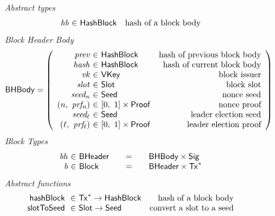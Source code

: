 \begin{figure*}[htb]
  \emph{Abstract types}
  \begin{equation*}
    \begin{array}{r@{~\in~}lr}
      \var{hb} & \HashBlock & \text{hash of a block body}\\
    \end{array}
  \end{equation*}
  \emph{Block Header Body}
  \begin{equation*}
    \BHBody =
    \left(
      \begin{array}{r@{~\in~}lr}
        \var{prev} & \HashBlock & \text{hash of previous block body}\\
        \var{hash} & \HashBlock & \text{hash of current block body}\\
        \var{vk} & \VKey & \text{block issuer}\\
        \var{slot} & \Slot & \text{block slot}\\
        \var{seed_{n}} & \Seed & \text{nonce seed}\\
        (n,~\var{prf_{n}}) & \unitInterval\times\Proof & \text{nonce proof}\\
        \var{seed_{\ell}} & \Seed & \text{leader election seed}\\
        (\ell,~\var{prf_{\ell}}) & \unitInterval\times\Proof & \text{leader election proof}\\
      \end{array}
    \right)
  \end{equation*}
  \emph{Block Types}
  \begin{equation*}
    \begin{array}{r@{~\in~}l@{\qquad=\qquad}l}
      \var{bh}
      & \BHeader
      & \BHBody \times \Sig
      \\
      \var{b}
      & \Block
      & \BHeader \times \seqof{\Tx}
    \end{array}
  \end{equation*}
  \emph{Abstract functions}
  \begin{equation*}
    \begin{array}{r@{~\in~}lr}
      \hashBlock{} & \seqof{\Tx} \to \HashBlock
                   & \text{hash of a block body} \\
      \slotToSeed{} & \Slot \to \Seed
                    & \text{convert a slot to a seed} \\
    \end{array}
  \end{equation*}

\end{figure*}
